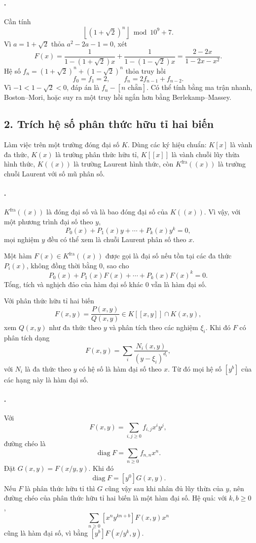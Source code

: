 \documentclass[11pt]{article}
\begin{document}
\paragraph{.}
Cần tính
\[
  \left\lfloor(1+\sqrt2)^n\right\rfloor \bmod 10^9+7.
\]
Vì \(a=1+\sqrt2\) thỏa \(a^2-2a-1=0\), xét
\[
  F(x)=\frac{1}{1-(1+\sqrt2)x}+\frac{1}{1-(1-\sqrt2)x}
  =\frac{2-2x}{1-2x-x^2}.
\]
Hệ số \(f_n=(1+\sqrt2)^n+(1-\sqrt2)^n\) thỏa truy hồi
\[
  f_0=f_1=2,\qquad f_n=2f_{n-1}+f_{n-2}.
\]
Vì \(-1<1-\sqrt2<0\), đáp án là \(f_n-[n\text{ chẵn}]\). Có thể tính bằng
ma trận nhanh, Boston--Mori, hoặc suy ra một truy hồi ngắn hơn bằng
Berlekamp--Massey.

\subsection*{2. Trích hệ số phân thức hữu tỉ hai biến}

Làm việc trên một trường đóng đại số \(K\). Dùng các ký hiệu chuẩn:
\(K[x]\) là vành đa thức, \(K(x)\) là trường phân thức hữu tỉ, \(K[[x]]\) là
vành chuỗi lũy thừa hình thức, \(K((x))\) là trường Laurent hình thức, còn
\(K^{\mathrm{fra}}((x))\) là trường chuỗi Laurent với số mũ phân số.

\paragraph{.}
\(K^{\mathrm{fra}}((x))\) là đóng đại số và là bao đóng đại số của
\(K((x))\). Vì vậy, với một phương trình đại số theo \(y\),
\[
  P_0(x)+P_1(x)y+\cdots+P_k(x)y^k=0,
\]
mọi nghiệm \(y\) đều có thể xem là chuỗi Laurent phân số theo \(x\).

Một hàm \(F(x)\in K^{\mathrm{fra}}((x))\) được gọi là đại số nếu tồn tại các
đa thức \(P_i(x)\), không đồng thời bằng \(0\), sao cho
\[
  P_0(x)+P_1(x)F(x)+\cdots+P_k(x)F(x)^k=0.
\]
Tổng, tích và nghịch đảo của hàm đại số khác \(0\) vẫn là hàm đại số.

Với phân thức hữu tỉ hai biến
\[
  F(x,y)=\frac{P(x,y)}{Q(x,y)}\in K[[x,y]]\cap K(x,y),
\]
xem \(Q(x,y)\) như đa thức theo \(y\) và phân tích theo các nghiệm
\(\xi_i\). Khi đó \(F\) có phân tích dạng
\[
  F(x,y)=\sum_i \frac{N_i(x,y)}{(y-\xi_i)^{d_i}},
\]
với \(N_i\) là đa thức theo \(y\) có hệ số là hàm đại số theo \(x\). Từ đó
mọi hệ số \([y^b]\) của các hạng này là hàm đại số.

\paragraph{.}
Với
\[
  F(x,y)=\sum_{i,j\ge0} f_{i,j}x^iy^j,
\]
đường chéo là
\[
  \operatorname{diag}F=\sum_{n\ge0} f_{n,n}x^n.
\]
Đặt \(G(x,y)=F(x/y,y)\). Khi đó
\[
  \operatorname{diag}F=[y^0]G(x,y).
\]
Nếu \(F\) là phân thức hữu tỉ thì \(G\) cũng vậy sau khi nhân đủ lũy thừa của
\(y\), nên đường chéo của phân thức hữu tỉ hai biến là một hàm đại số. Hệ quả:
với \(k,b\ge0\),
\[
  \sum_{n\ge0} [x^n y^{kn+b}]F(x,y)x^n
\]
cũng là hàm đại số, vì bằng \([y^b]F(x/y^k,y)\).
\end{document}
